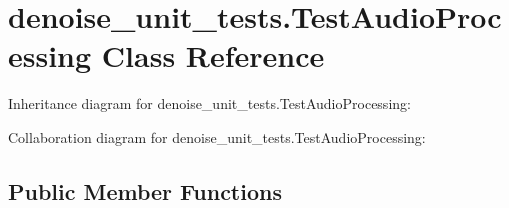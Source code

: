 \hypertarget{classdenoise__unit__tests_1_1TestAudioProcessing}{\section{denoise\-\_\-unit\-\_\-tests.\-Test\-Audio\-Processing Class Reference}
\label{classdenoise__unit__tests_1_1TestAudioProcessing}
}


Inheritance diagram for denoise\-\_\-unit\-\_\-tests.\-Test\-Audio\-Processing\-:


Collaboration diagram for denoise\-\_\-unit\-\_\-tests.\-Test\-Audio\-Processing\-:
\subsection*{Public Member Functions}
